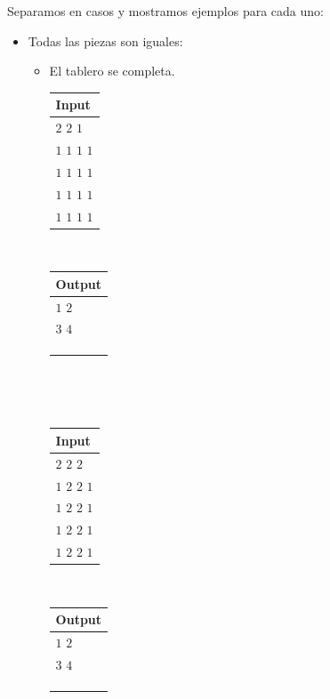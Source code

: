 \documentclass[11pt, a4paper, twoside]{article}
\begin{document}
Separamos en casos y mostramos ejemplos para cada uno: 
\begin{itemize}
\item Todas las piezas son iguales:
	\begin{itemize}
		\item El tablero se completa. \\
			\begin{minipage}{0.2\textwidth}
				\begin{tabular}{l}
					Input  \\
					\hline
					$2$ $2$ $1$       \\
					$1$ $1$ $1$ $1$ \\
					$1$ $1$ $1$ $1$ \\
					$1$ $1$ $1$ $1$ \\
					$1$ $1$ $1$ $1$ \\
				\end{tabular} \\  
			\end{minipage}
			\begin{minipage}{0.2\textwidth}	
				\begin{tabular}{l}
					Output  \\
					\hline
					$1$ $2$ \\
					$3$ $4$ \\
					\\
					\\
					\\
				\end{tabular} \\
			\end{minipage} \\
			\begin{minipage}{0.2\textwidth}
				\begin{tabular}{l}
					Input  \\
					\hline
					$2$ $2$ $2$       \\
					$1$ $2$ $2$ $1$ \\
					$1$ $2$ $2$ $1$ \\
					$1$ $2$ $2$ $1$ \\
					$1$ $2$ $2$ $1$ \\
				\end{tabular} \\  
			\end{minipage}
			\begin{minipage}{0.2\textwidth}	
				\begin{tabular}{l}
					Output  \\
					\hline
					$1$ $2$ \\
					$3$ $4$ \\
					\\
					\\
					\\
				\end{tabular} \\
			\end{minipage} \\
			

\end{itemize}
\end{itemize}
\end{document}
